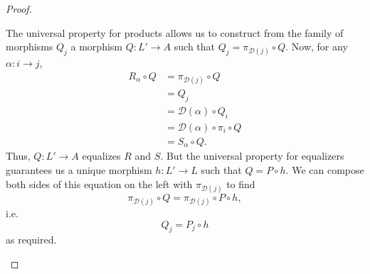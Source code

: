 \documentclass[a4paper,10pt]{scrreprt}
\theoremstyle{definition}
\theoremstyle{plain}
\theoremstyle{remark}
\begin{document}
\begin{proof}
\begin{enumerate}
      The universal property for products allows us to construct from the family of morphisms $Q_{j}$ a morphism $Q\colon L' \to A$ such that $Q_{j} = \pi_{\mathcal{D}(j)} \circ Q$. Now, for any $\alpha\colon i \to j$,
      \begin{align*}
        R_{\alpha} \circ Q &= \pi_{\mathcal{D}(j)} \circ Q \\
        &= Q_{j} \\
        &= \mathcal{D}(\alpha) \circ Q_{i} \\
        &= \mathcal{D}(\alpha) \circ \pi_{i} \circ Q \\
        &= S_{\alpha} \circ Q.
      \end{align*}
      Thus, $Q\colon L' \to A$ equalizes $R$ and $S$. But the universal property for equalizers guarantees us a unique morphism $h\colon L' \to L$ such that $Q = P \circ h$. We can compose both sides of this equation on the left with $\pi_{\mathcal{D}(j)}$ to find
      \begin{equation*}
        \pi_{\mathcal{D}(j)} \circ Q = \pi_{\mathcal{D}(j)} \circ P \circ h,
      \end{equation*}
      i.e.
      \begin{equation*}
        Q_{j} = P_{j} \circ h
      \end{equation*}
      as required.
  \end{enumerate}
\end{proof}
\end{document}
